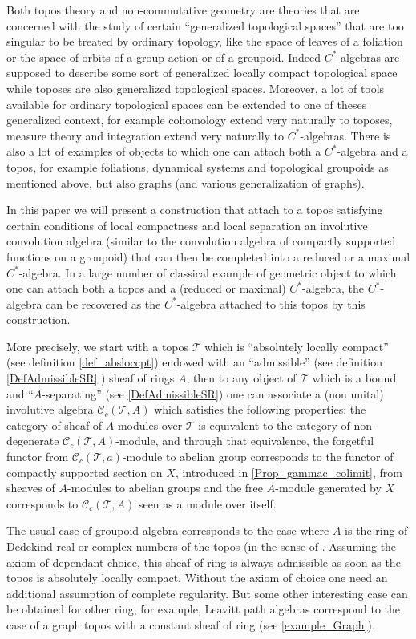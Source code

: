 \documentclass[a4paper]{article}
\newcommand{\Tcal}{\mathcal{T}}
\newcommand{\Ccal}{\mathcal{C}}
\newcommand{\blockn}[1]{\par #1 \bigskip}
\begin{document}
\blockn{Both topos theory and non-commutative geometry are theories that are concerned with the study of certain ``generalized topological spaces'' that are too singular to be treated by ordinary topology, like the space of leaves of a foliation or the space of orbits of a group action or of a groupoid. Indeed $C^*$-algebras are supposed to describe some sort of generalized locally compact topological space while toposes are also generalized topological spaces. Moreover, a lot of tools available for ordinary topological spaces can be extended to one of theses generalized context, for example cohomology extend very naturally to toposes, measure theory and integration extend very naturally to $C^*$-algebras. There is also a lot of examples of objects to which one can attach both a $C^*$-algebra and a topos, for example foliations, dynamical systems and topological groupoids as mentioned above, but also graphs (and various generalization of graphs).}

\blockn{In this paper we will present a construction that attach to a topos satisfying certain conditions of local compactness and local separation an involutive convolution algebra (similar to the convolution algebra of compactly supported functions on a groupoid) that can then be completed into a reduced or a maximal $C^*$-algebra. In a large number of classical example of geometric object to which one can attach both a topos and a (reduced or maximal) $C^*$-algebra, the $C^*$-algebra can be recovered as the $C^*$-algebra attached to this topos by this construction.}

\blockn{More precisely, we start with a topos $\Tcal$ which is ``absolutely locally compact'' (see definition \ref{def_absloccpt}) endowed with an ``admissible'' (see definition \ref{DefAdmissibleSR} ) sheaf of rings $A$, then to any object of $\Tcal$ which is a bound and ``$A$-separating'' (see \ref{DefAdmissibleSR}) one can associate a (non unital) involutive algebra $\Ccal_c(\Tcal,A)$ which satisfies the following properties: the category of sheaf of $A$-modules over $\Tcal$ is equivalent to the category of non-degenerate $\Ccal_c(\Tcal,A)$-module, and through that equivalence, the forgetful functor from $\Ccal_c(\Tcal,a)$-module to abelian group corresponds to the functor of compactly supported section on $X$, introduced in \ref{Prop_gammac_colimit}, from sheaves of $A$-modules to abelian groups and the free $A$-module generated by $X$ corresponds to $\Ccal_c(\Tcal,A)$ seen as a module over itself.
}

\blockn{The usual case of groupoid algebra corresponds to the case where $A$ is the ring of Dedekind real or complex numbers of the topos (in the sense of \cite[D4.7]{sketches}. Assuming the axiom of dependant choice, this sheaf of ring is always admissible as soon as the topos is absolutely locally compact. Without the axiom of choice one need an additional assumption of complete regularity. But some other interesting case can be obtained for other ring, for example, Leavitt path algebras correspond to the case of a graph topos with a constant sheaf of ring (see \ref{example_Graph}).}
\end{document}
